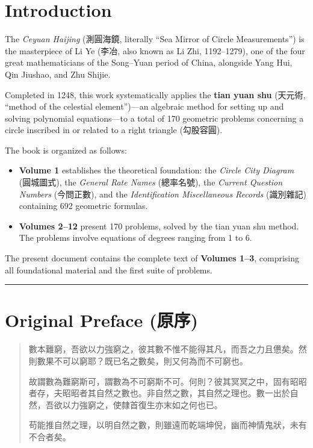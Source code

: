 \documentclass[11pt,a4paper]{article}
\begin{document}
\section{Introduction}
\label{sec:intro}

The \textit{Ceyuan Haijing} (測圓海鏡, literally ``Sea Mirror of Circle Measurements'') is the masterpiece of Li Ye (李冶, also known as Li Zhi, 1192–1279), one of the four great mathematicians of the Song--Yuan period of China, alongside Yang Hui, Qin Jiushao, and Zhu Shijie.

Completed in 1248, this work systematically applies the \textbf{tian yuan shu} (天元術, ``method of the celestial element'')---an algebraic method for setting up and solving polynomial equations---to a total of 170 geometric problems concerning a circle inscribed in or related to a right triangle (勾股容圓).

The book is organized as follows:
\begin{itemize}[leftmargin=2em]
  \item \textbf{Volume 1} establishes the theoretical foundation: the \textit{Circle City Diagram} (圓城圖式), the \textit{General Rate Names} (總率名號), the \textit{Current Question Numbers} (今問正數), and the \textit{Identification Miscellaneous Records} (識別雜記) containing 692 geometric formulas.
  \item \textbf{Volumes 2--12} present 170 problems, solved by the tian yuan shu method. The problems involve equations of degrees ranging from 1 to 6.
\end{itemize}

The present document contains the complete text of \textbf{Volumes 1–3}, comprising all foundational material and the first suite of problems.

\vspace{0.5cm}
\noindent\textcolor{rulecolor}{\rule{\textwidth}{0.4pt}}

\newpage
\section{Original Preface (原序)}
\label{sec:preface}

{\color{prefacecolor}
\begin{quote}
數本難窮，吾欲以力強窮之，彼其數不惟不能得其凡，而吾之力且憊矣。然則數果不可以窮耶？既已名之數矣，則又何為而不可窮也。

故謂數為難窮斯可，謂數為不可窮斯不可。何則？彼其冥冥之中，固有昭昭者存，夫昭昭者其自然之數也。非自然之數，其自然之理也。數一出於自然，吾欲以力強窮之，使隸首復生亦末如之何也已。

苟能推自然之理，以明自然之數，則雖遠而乾端坤倪，幽而神情鬼狀，未有不合者矣。
\end{quote}
}
\end{document}

